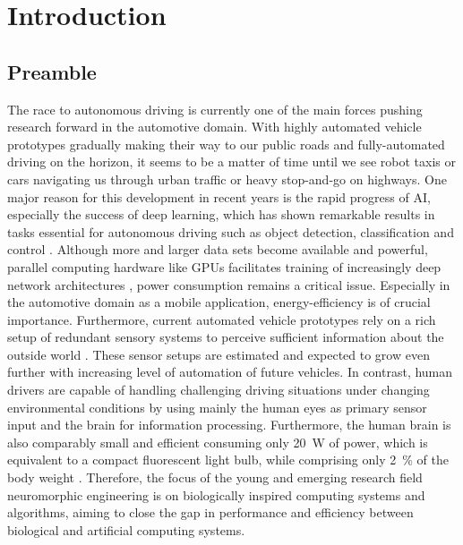 \chapter{Introduction}%
\label{chap:introduction}

\section{Preamble}%
\label{sec:preamble}

The race to autonomous driving is currently one of the main forces pushing research forward in the automotive domain.
With highly automated vehicle prototypes gradually making their way to our public roads and fully-automated driving on the horizon, it seems to be a matter of time until we see robot taxis or cars navigating us through urban traffic or heavy stop-and-go on highways.
One major reason for this development in recent years is the rapid progress of \ac{AI}, especially the success of deep learning, which has shown remarkable results in tasks essential for autonomous driving such as object detection, classification \parencite{Ciresan2012} and control \parencite{Bojarski2016}.
Although more and larger data sets \parencite{Geiger2013a, Cordts2016} become available and powerful, parallel computing hardware like \acp{GPU} facilitates training of increasingly deep network architectures \parencite{Simonyan2014}, power consumption remains a critical issue.
Especially in the automotive domain as a mobile application, energy-efficiency is of crucial importance.
Furthermore, current automated vehicle prototypes rely on a rich setup of redundant sensory systems to perceive sufficient information about the outside world \parencite{Aeberhard2015}.
These sensor setups are estimated and expected to grow even further with increasing level of automation of future vehicles.
In contrast, human drivers are capable of handling challenging driving situations under changing environmental conditions by using mainly the human eyes as primary sensor input and the brain for information processing.
Furthermore, the human brain is also comparably small and efficient consuming only \SI{20}{\watt} of power, which is equivalent to a compact fluorescent light bulb, while comprising only \SI{2}{\percent} of the body weight \parencite[Chap. 2.1]{Eliasmith2013}.
Therefore, the focus of the young and emerging research field neuromorphic engineering is on biologically inspired computing systems and algorithms, aiming to close the gap in performance and efficiency between biological and artificial computing systems.
